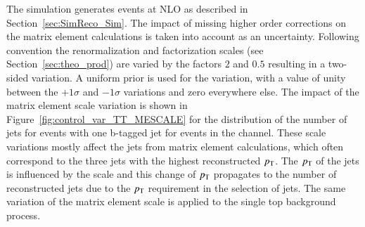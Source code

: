 The \POWHEG simulation generates \ttbar events at NLO as described in Section~\ref{sec:SimReco_Sim}.
The impact of missing higher order corrections on the matrix element calculations is taken into account as an uncertainty.
Following convention the renormalization and factorization scales (see Section~\ref{sec:theo_prod}) are varied by the factors $2$ and $0.5$ resulting in a two-sided variation.
A uniform prior is used for the variation, with a value of unity between the $+1\sigma$ and $-1\sigma$ variations and zero everywhere else.
The impact of the matrix element scale variation is shown in Figure~\ref{fig:control_var_TT_MESCALE} for the distribution of the number of jets for events with one b-tagged jet for events in the \emu channel.
These scale variations mostly affect the jets from matrix element calculations, which often correspond to the three jets with the highest reconstructed $p_{\mathrm{T}}$.
The $p_{\mathrm{T}}$ of the jets is influenced by the scale and this change of $p_{\mathrm{T}}$ propagates to the number of reconstructed jets due to the $p_{\mathrm{T}}$ requirement in the selection of jets.
The same variation of the matrix element scale is applied to the single top background process.

